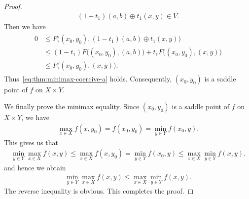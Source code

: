 \documentclass[10pt,a4paper]{amsart}
\begin{document}
\begin{proof}
 \begin{align}
  (1-t_1) (a,b) \oplus t_1 (x,y)  
  \in V. 
 \end{align}
 Then we have 
 \begin{align}
 \begin{split}
  0 
  &\leq F\bigl((x_0,y_0), (1-t_1) (a,b) \oplus t_1 (x,y) \bigr) \\
  &\leq (1-t_1)F\bigl((x_0,y_0), (a,b) \bigr) 
 + t_1 F\bigl((x_0,y_0), (x,y) \bigr) \\
  &\leq  F\bigl((x_0,y_0), (x,y) \bigr).   
 \end{split}
 \end{align}
 Thus~\eqref{eq:thm:minimax-coercive-a} holds. 
 Consequently, $(x_0,y_0)$ is a saddle point of $f$ on $X\times Y$. 

 We finally prove the minimax equality. 
 Since $(x_0,y_0)$ is a saddle point of $f$ on $X\times Y$, we have 
 \begin{align}
  \max_{x\in X}f(x,y_0) = f(x_0,y_0) = \min_{y\in Y} f(x_0,y). 
 \end{align}
 This gives us that 
 \begin{align}
  \min_{y\in Y}\max_{x\in X}f(x,y)
  \leq \max_{x\in X}f(x,y_0) = 
  \min_{y\in Y} f(x_0,y)
  \leq \max_{x\in X}\min_{y\in Y} f(x,y). 
 \end{align}
 and hence we obtain 
 \begin{align}
  \min_{y\in Y}\max_{x\in X}f(x,y)
  \leq \max_{x\in X}\min_{y\in Y} f(x,y). 
 \end{align}
 The reverse inequality is obvious. This completes the proof. 
\end{proof}
\end{document}
